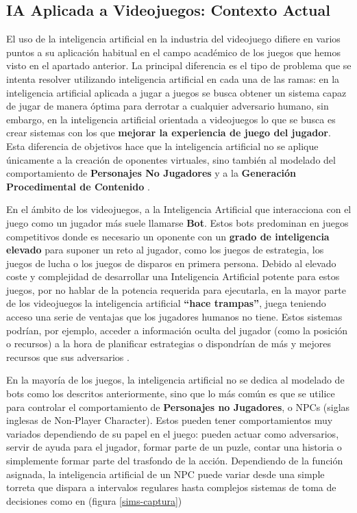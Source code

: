 \subsection{IA Aplicada a Videojuegos: Contexto Actual}
El uso de la inteligencia artificial en la industria del videojuego difiere en varios puntos a su aplicación habitual en el campo académico de los juegos que hemos visto en el apartado anterior. La principal diferencia es el tipo de problema que se intenta resolver utilizando inteligencia artificial en cada una de las ramas: en la inteligencia artificial aplicada a jugar a juegos se busca obtener un sistema capaz de jugar de manera óptima para derrotar a cualquier adversario humano, sin embargo, en la inteligencia artificial orientada a videojuegos lo que se busca es crear sistemas con los que \textbf{mejorar la experiencia de juego del jugador}. Esta diferencia de objetivos hace que la inteligencia artificial no se aplique únicamente a la creación de oponentes virtuales, sino también al modelado del comportamiento de \textbf{Personajes No Jugadores} y a la \textbf{Generación Procedimental de Contenido} \cite{ai_and_games}.

En el ámbito de los videojuegos, a la Inteligencia Artificial que interacciona con el juego como un jugador más suele llamarse \textbf{Bot}. Estos bots predominan en juegos competitivos donde es necesario un oponente con un \textbf{grado de inteligencia elevado} para suponer un reto al jugador, como los juegos de estrategia, los juegos de lucha o los juegos de disparos en primera persona. Debido al elevado coste y complejidad de desarrollar una Inteligencia Artificial potente para estos juegos, por no hablar de la potencia requerida para ejecutarla, en la mayor parte de los videojuegos la inteligencia artificial \textbf{``hace trampas''}, juega teniendo acceso una serie de ventajas que los jugadores humanos no tiene. Estos sistemas podrían, por ejemplo, acceder a información oculta del jugador (como la posición o recursos) a la hora de planificar estrategias o dispondrían de más y mejores recursos que sus adversarios \cite{ai_and_games}.

En la mayoría de los juegos, la inteligencia artificial no se dedica al modelado de bots como los descritos anteriormente, sino que lo más común es que se utilice para controlar el comportamiento de \textbf{Personajes no Jugadores}, o NPCs (siglas inglesas de Non-Player Character). Estos pueden tener comportamientos muy variados dependiendo de su papel en el juego: pueden actuar como adversarios, servir de ayuda para el jugador, formar parte de un puzle, contar una historia o simplemente formar parte del trasfondo de la acción. Dependiendo de la función asignada, la inteligencia artificial de un NPC puede variar desde una simple torreta que dispara a intervalos regulares hasta complejos sistemas de toma de decisiones como en  (figura \ref{sims-captura})

